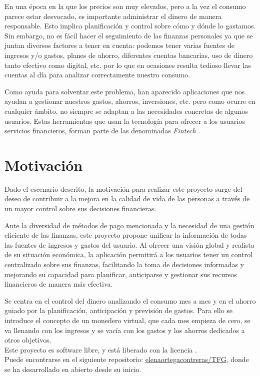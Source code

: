 En una época en la que los precios son muy elevados, pero a la vez el consumo parece estar desvocado, es importante administrar el dinero de manera responsable. Esto implica planificación y control sobre cómo y dónde lo gastamos.
Sin embargo, no es fácil hacer el seguimiento de las finanzas personales ya que se 
juntan diversos factores a tener en cuenta: podemos tener varias fuentes de ingresos y/o 
gastos, planes de ahorro, diferentes cuentas bancarias, uso de dinero tanto 
efectivo como digital, etc. por lo que en ocasiones resulta tedioso 
llevar las cuentas al día para analizar correctamente nuestro consumo.

Como ayuda para solventar este problema, han aparecido aplicaciones que nos ayudan a gestionar nuestros gastos, ahorros, inversiones, etc. pero como ocurre en cualquier ámbito, no siempre se adaptan a las necesidades concretas de algunos usuarios. Estas herramientas que usan la tecnología para ofrecer a los usuarios servicios financieros, forman parte de las denominadas \textit{Fintech} \cite{schueffel2016taming}.

\section{Motivación}
Dado el escenario descrito, la motivación para realizar este proyecto surge del deseo de contribuir a la mejora en la calidad de vida de las personas a través de un mayor control sobre sus decisiones financieras. 

Ante la diversidad de métodos de pago mencionada y la necesidad de una gestión eficiente de las finanzas, este proyecto propone unificar la información de todas las fuentes de ingresos y gastos del usuario. Al ofrecer una visión global y realista de su situación económica, la aplicación permitirá a los usuarios tener un control centralizado sobre sus finanzas, facilitando la toma de decisiones informadas y mejorando su capacidad para planificar, anticiparse y gestionar sus recursos financieros de manera más efectiva.

Se centra en el control del dinero analizando el consumo mes a mes y en el ahorro guiado por la planificación, anticipación y previsión de gastos. Para ello 
se introduce el concepto de un monedero virtual, que cada mes empieza de cero, se va llenando con los ingresos y se vacía con los gastos y los ahorros dedicados a otros objetivos.\\

Este proyecto es software libre, y está liberado con la licencia \cite{gplv3}.\\
Puede encontrarse en el siguiente repositorio:
\href{https://github.com/elenaortegacontreras/TFG}{elenaortegacontreras/TFG}, 
donde se ha desarrollado en abierto desde su inicio.

